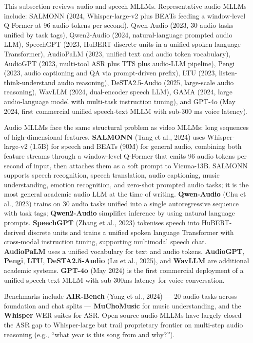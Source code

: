 This subsection reviews audio and speech MLLMs. Representative audio MLLMs include: SALMONN (2024, Whisper-large-v2 plus BEATs feeding a window-level Q-Former at 96 audio tokens per second), Qwen-Audio (2023, 30 audio tasks unified by task tags), Qwen2-Audio (2024, natural-language prompted audio LLM), SpeechGPT (2023, HuBERT discrete units in a unified spoken language Transformer), AudioPaLM (2023, unified text and audio token vocabulary), AudioGPT (2023, multi-tool ASR plus TTS plus audio-LLM pipeline), Pengi (2023, audio captioning and QA via prompt-driven prefix), LTU (2023, listen-think-understand audio reasoning), DeSTA2.5-Audio (2025, large-scale audio reasoning), WavLLM (2024, dual-encoder speech LLM), GAMA (2024, large audio-language model with multi-task instruction tuning), and GPT-4o (May 2024, first commercial unified speech-text MLLM with sub-300 ms voice latency).

Audio MLLMs face the same structural problem as video MLLMs: long sequences of high-dimensional features. \textbf{SALMONN} (Tang et al., 2024) uses Whisper-large-v2 (1.5B) for speech and BEATs (90M) for general audio, combining both feature streams through a window-level Q-Former that emits 96 audio tokens per second of input, then attaches them as a soft prompt to Vicuna-13B. SALMONN supports speech recognition, speech translation, audio captioning, music understanding, emotion recognition, and zero-shot prompted audio tasks; it is the most general academic audio LLM at the time of writing. \textbf{Qwen-Audio} (Chu et al., 2023) trains on 30 audio tasks unified into a single autoregressive sequence with task tags; \textbf{Qwen2-Audio} simplifies inference by using natural language prompts. \textbf{SpeechGPT} (Zhang et al., 2023) tokenises speech into HuBERT-derived discrete units and trains a unified spoken language Transformer with cross-modal instruction tuning, supporting multimodal speech chat. \textbf{AudioPaLM} uses a unified vocabulary for text and audio tokens. \textbf{AudioGPT}, \textbf{Pengi}, \textbf{LTU}, \textbf{DeSTA2.5-Audio} (Lu et al., 2025), and \textbf{WavLLM} are additional academic systems. \textbf{GPT-4o} (May 2024) is the first commercial deployment of a unified speech-text MLLM with sub-300ms latency for voice conversation.

Benchmarks include \textbf{AIR-Bench} (Yang et al., 2024) --- 20 audio tasks across foundation and chat splits --- \textbf{MuChoMusic} for music understanding, and the \textbf{Whisper} WER suites for ASR. Open-source audio MLLMs have largely closed the ASR gap to Whisper-large but trail proprietary frontier on multi-step audio reasoning (e.g., ``what year is this song from and why?'').

